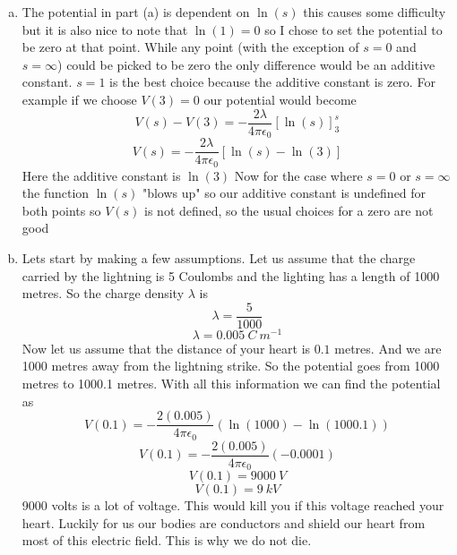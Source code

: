 \documentclass[11pt]{article}
\numberwithin{equation}{section}
\begin{document}
\begin{enumerate}[(a)]
\item
The potential in part (a) is dependent on $\ln(s)$ this causes some difficulty but it is also nice to note that $\ln(1) =0$ so I chose to set the potential to be zero at that point. While any point (with the exception of $s=0$ and $s=\infty$) could be picked to be zero the only difference would be an additive constant.
$s=1$ is the best choice because the additive constant is zero. For example if we choose $V(3) = 0$ our potential would become
$$V(s) - V(3) = -\frac{2\lambda}{4\pi\epsilon_0}\left[\ln(s)\right]_3^s$$
$$V(s) = -\frac{2\lambda}{4\pi\epsilon_0}\left[\ln(s) - \ln(3)\right]$$
Here the additive constant is $\ln(3)$
Now for the case where $s=0$ or $s=\infty$ the function $\ln(s)$ "blows up" so our additive constant is undefined for both points so $V(s)$ is not defined, so the usual choices for a zero are not good 

\item
Lets start by making a few assumptions. Let us assume that the charge carried by the lightning is 5 Coulombs and the lighting has a length of 1000 metres. So the charge density $\lambda$ is
$$\lambda = \frac{5}{1000}$$
$$\lambda = 0.005\ C\ m^{-1}$$
Now let us assume that the distance of your heart is $0.1$ metres. And we are 1000 metres away from the lightning strike. So the potential goes from 1000 metres to 1000.1 metres. With all this information we can find the potential as
$$V(0.1) = -\frac{2(0.005)}{4\pi\epsilon_0}(\ln(1000)-\ln(1000.1))$$
$$V(0.1) = -\frac{2(0.005)}{4\pi\epsilon_0}(-0.0001)$$
$$V(0.1) = 9000\ V$$
$$V(0.1) = 9\ kV$$
9000 volts is a lot of voltage. This would kill you if this voltage reached your heart. Luckily for us our bodies are conductors and shield our heart from most of this electric field. This is why we do not die.
\end{enumerate}
\end{document}

